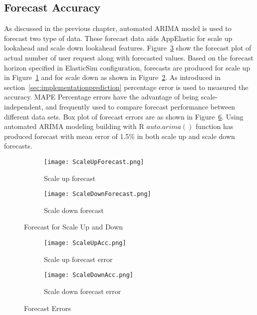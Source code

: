 \subsection{Forecast Accuracy}
\label{sub:Forecast Accuracy}
As discussed in the previous chapter, automated ARIMA model is used to forecast two type of data. These forecast data aids AppElastic for scale up lookahead and scale down lookahead features. Figure~\ref{fig:forecast} show the forecast plot of actual number of user request along with forecasted values. Based on the forecast horizon specified in ElasticSim configuration, forecasts are produced for scale up in Figure~\ref{figure:forecastscaleup} and for scale down as shown in Figure~\ref{figure:forecastscaledown}. As introduced in section~\ref{sec:implementationprediction} percentage error is used to measured the accuracy. MAPE Percentage errors have the advantage of being scale-independent, and frequently used to compare forecast performance between different data sets. Box plot of forecast errors are as shown in Figure~\ref{fig:forecasterror}. Using automated ARIMA modeling building with R \(auto.arima()\) function has produced forecast with mean error of 1.5\% in both scale up and scale down forecasts.
\begin{figure}
     \centering
     \begin{subfigure}[b]{0.9\textwidth}
         \texttt{[image: ScaleUpForecast.png]}
         \caption{Scale up forecast}
         \label{figure:forecastscaleup}
     \end{subfigure}
     \begin{subfigure}[b]{0.9\textwidth}
         \texttt{[image: ScaleDownForecast.png]}
         \caption{Scale down forecast}
         \label{figure:forecastscaledown}
     \end{subfigure}
     \caption{Forecast for Scale Up and Down}
     \label{fig:forecast}
\end{figure}
\begin{figure}
     \centering
     \begin{subfigure}[b]{0.45\textwidth}
         \texttt{[image: ScaleUpAcc.png]}
         \caption{Scale up forecast error}
         \label{figure:forecastscaleuperror}
     \end{subfigure}
     \hfill
     \begin{subfigure}[b]{0.45\textwidth}
         \texttt{[image: ScaleDownAcc.png]}
         \caption{Scale down forecast error}
         \label{figure:forecastscaledownerror}
     \end{subfigure}
     \caption{Forecast Errors}
     \label{fig:forecasterror}
\end{figure}
